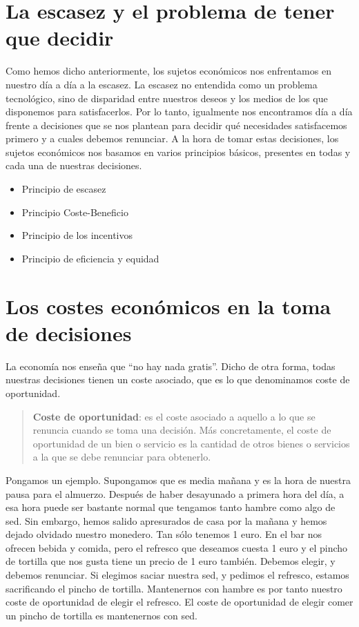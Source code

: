 \documentclass[
]{krantz}
\providecommand{\tightlist}{%
  \setlength{\itemsep}{0pt}\setlength{\parskip}{0pt}}
\begin{document}
\hypertarget{la-escasez-y-el-problema-de-tener-que-decidir}{%
\section{La escasez y el problema de tener que decidir}\label{la-escasez-y-el-problema-de-tener-que-decidir}}

Como hemos dicho anteriormente, los sujetos económicos nos enfrentamos en nuestro día a día a la escasez. La escasez no entendida como un problema tecnológico, sino de disparidad
entre nuestros deseos y los medios de los que disponemos para satisfacerlos.
Por lo tanto, igualmente nos encontramos día a día frente a decisiones que se nos plantean para decidir qué necesidades satisfacemos primero y a cuales debemos renunciar. A la hora de tomar estas decisiones, los sujetos económicos nos basamos en varios principios básicos, presentes en todas y cada una de nuestras decisiones.

\begin{itemize}
\tightlist
\item
  Principio de escasez
\item
  Principio Coste-Beneficio
\item
  Principio de los incentivos
\item
  Principio de eficiencia y equidad
\end{itemize}

\hypertarget{los-costes-econuxf3micos-en-la-toma-de-decisiones}{%
\section{Los costes económicos en la toma de decisiones}\label{los-costes-econuxf3micos-en-la-toma-de-decisiones}}

La economía nos enseña que ``no hay nada gratis''. Dicho de otra forma, todas nuestras decisiones tienen un coste asociado, que es lo que denominamos coste de oportunidad.

\begin{quote}
\textbf{Coste de oportunidad}: es el coste asociado a aquello a lo que se renuncia cuando se toma una decisión. Más concretamente, el coste de oportunidad de un bien o servicio es la cantidad de otros bienes o servicios a la que se debe renunciar para obtenerlo.
\end{quote}

Pongamos un ejemplo. Supongamos que es media mañana y es la hora de nuestra pausa para el almuerzo. Después de haber desayunado a primera hora del día, a esa hora puede ser bastante normal que tengamos tanto hambre como algo de sed. Sin embargo, hemos salido apresurados de casa por la mañana y hemos dejado olvidado nuestro monedero. Tan sólo tenemos 1 euro.
En el bar nos ofrecen bebida y comida, pero el refresco que deseamos cuesta 1 euro y el pincho de tortilla que nos gusta tiene un precio de 1 euro también. Debemos elegir, y debemos renunciar. Si elegimos saciar nuestra sed, y pedimos el refresco, estamos sacrificando el pincho de tortilla. Mantenernos con hambre es por tanto nuestro coste de oportunidad de elegir el refresco. El coste de oportunidad de elegir comer un pincho de tortilla es mantenernos con sed.
\end{document}
